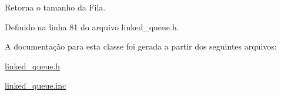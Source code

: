 Retorna o tamanho da Fila. 



Definido na linha 81 do arquivo linked\+\_\+queue.\+h.



A documentação para esta classe foi gerada a partir dos seguintes arquivos\+:\begin{DoxyCompactItemize}
\item 
\mbox{\hyperlink{linked__queue_8h}{linked\+\_\+queue.\+h}}\item 
\mbox{\hyperlink{linked__queue_8inc}{linked\+\_\+queue.\+inc}}\end{DoxyCompactItemize}
